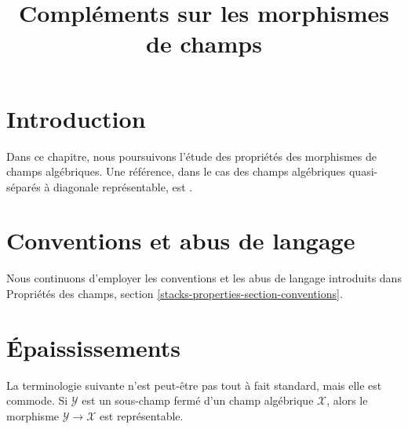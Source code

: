 

%


\title{Compléments sur les morphismes de champs}


\maketitle

\label{section-phantom}

\tableofcontents

\section{Introduction}
\label{section-introduction}

\noindent
Dans ce chapitre, nous poursuivons l'étude des propriétés des morphismes de
champs algébriques. Une référence, dans le cas des champs algébriques quasi-séparés
à diagonale représentable, est \cite{LM-B}.




\section{Conventions et abus de langage}
\label{section-conventions}

\noindent
Nous continuons d'employer les conventions et les abus de langage
introduits dans
Propriétés des champs, section \ref{stacks-properties-section-conventions}.






\section{Épaississements}
\label{section-thickenings}

\noindent
La terminologie suivante n'est peut-être pas tout à fait standard, mais elle est commode.
Si $\mathcal{Y}$ est un sous-champ fermé d'un champ algébrique $\mathcal{X}$,
alors le morphisme $\mathcal{Y} \to \mathcal{X}$ est représentable.

